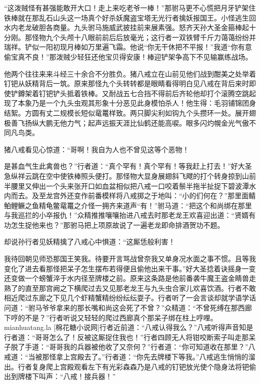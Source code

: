 \documentclass[12pt,UTF8]{ctexbook}
\begin{document}
“这泼贼怪有甚强能敢开大口！走上来吃老爷一棒！”那驸马更不心慌把月牙铲架住铁棒就在那乱石山头这一场真个好杀妖魔盗宝塔无光行者擒妖报国王。小怪逃生回水内老龙破胆各商量。九头驸马施威武披挂前来展素强。怒齐天孙大圣金箍棒起十分刚。那怪物九个头颅十八眼前前后后放毫光；这行者一双铁臂千斤力蔼蔼纷纷并瑞祥。铲似一阳初现月棒如万里遍飞霜。他说“你无干休把不平报！”我道“你有意偷宝真不良！”那泼贼少轻狂还他宝贝得安康！棒迎铲架争高下不见输赢练战场。

他两个往往来来斗经三十余合不分胜负。猪八戒立在山前见他们战到酣美之处举着钉钯从妖精背后一筑。原来那怪九个头转转都是眼睛看得明白见八戒在背后来时即使铲鐏架着钉钯铲头抵着铁棒。又耐战五七合挡不得前后齐轮他却打个滚腾空跳起现了本象乃是一个九头虫观其形象十分恶见此身模怕杀人！他生得：毛羽铺锦团身结絮。方圆有丈二规模长短似鼋鼍样致。两只脚尖利如钩九个头攒环一处。展开翅极善飞扬纵大鹏无他力气；起声远振天涯比仙鹤还能高唳。眼多闪灼幌金光气傲不同凡鸟类。

猪八戒看见心惊道：“哥啊！我自为人也不曾见这等个恶物！

是甚血气生此禽兽也？”行者道：“真个罕有！真个罕有！等我赶上打去！”好大圣急纵祥云跳在空中使铁棒照头便打。那怪物大显身展翅斜飞飕的打个转身掠到山前半腰里又伸出一个头来张开口如血盆相似把八戒一口咬着鬃半拖半扯捉下碧波潭水内而去。及至龙宫外还变作前番模样将八戒掷之于地叫：“小的们何在？”那里面鲭鲌鲤鳜之鱼精龟鳖鼋鼍之介怪一拥齐来道声“有！”驸马道：“把这个和尚绑在那里与我巡拦的小卒报仇！”众精推推嚷嚷抬进八戒去时那老龙王欢喜迎出道：“贤婿有功怎生捉他来也？”那驸马把上项原故说了一遍老龙即命排酒贺功不题。

却说孙行者见妖精擒了八戒心中惧道：“这厮恁般利害！

我待回朝见师恐那国王笑我。待要开言骂战曾奈我又单身况水面之事不惯。且等我变化了进去看那怪把呆子怎生摆布若得便且偷他出来干事。”好大圣捻着诀摇身一变还变做一个螃蟹淬于水内径至牌楼之前。原来这条路是他前番袭牛魔王盗金睛兽走熟了的直至那宫阙之下横爬过去又见那老龙王与九头虫合家儿欢喜饮酒。行者不敢相近爬过东廊之下见几个虾精蟹精纷纷纭纭耍子。行者听了一会言谈却就学语学话问道：“驸马爷爷拿来的那长嘴和尚这会死了不曾？”众精道：“不曾死缚在那西廊下哼的不是？”行者听说又轻轻的爬过西廊真个那呆子绑在柱上哼哩。mianhuatang.la [棉花糖小说网]行者近前道：“八戒认得我么？”八戒听得声音知是行者道：“哥哥怎么了！反被这厮捉住我也！”行者四顾无人将钳咬断索子叫走那呆子脱了手道：“哥哥我的兵器被他收了又奈何？”行者道：“你可知道收在那里？”八戒道：“当被那怪拿上宫殿去了。”行者道：“你先去牌楼下等我。”八戒逃生悄悄的溜出。行者复身爬上宫殿观看左下有光彩森森乃是八戒的钉钯放光使个隐身法将钯偷出到牌楼下叫声：“八戒！接兵器！”
\end{document}
